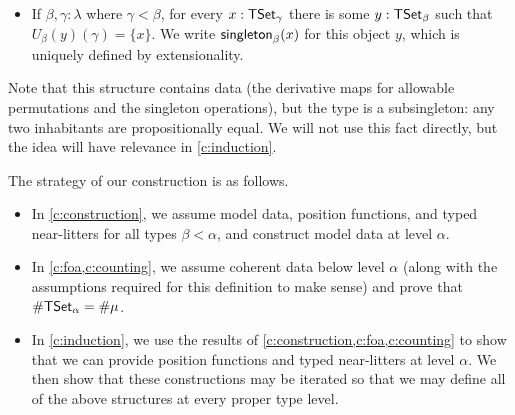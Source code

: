 \begin{definition}
\begin{itemize}
    \item If \( \beta, \gamma : \lambda \) where \( \gamma < \beta \), for every \( x : \mathsf{TSet}_\gamma \) there is some \( y : \mathsf{TSet}_\beta \) such that \( U_\beta(y)(\gamma) = \{ x \} \).
    We write \( \operatorname{\mathsf{singleton}}_\beta(x) \) for this object \( y \), which is uniquely defined by extensionality.
  \end{itemize}
  Note that this structure contains data (the derivative maps for allowable permutations and the singleton operations), but the type is a subsingleton: any two inhabitants are propositionally equal.
  We will not use this fact directly, but the idea will have relevance in \cref{c:induction}.
\end{definition}
The strategy of our construction is as follows.
\begin{itemize}
  \item In \cref{c:construction}, we assume model data, position functions, and typed near-litters for all types \( \beta < \alpha \), and construct model data at level \( \alpha \).
  \item In \cref{c:foa,c:counting}, we assume coherent data below level \( \alpha \) (along with the assumptions required for this definition to make sense) and prove that \( \#\mathsf{TSet}_\alpha = \#\mu \).
  \item In \cref{c:induction}, we use the results of \cref{c:construction,c:foa,c:counting} to show that we can provide position functions and typed near-litters at level \( \alpha \).
  We then show that these constructions may be iterated so that we may define all of the above structures at every proper type level.
\end{itemize}
